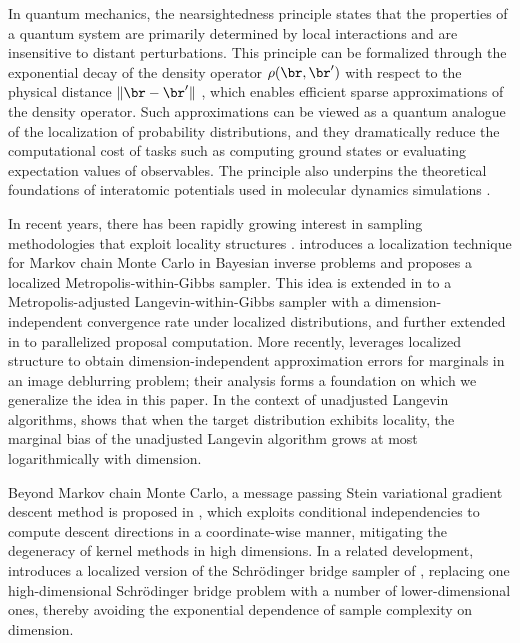 \documentclass[11pt]{article}
\begin{document}
In quantum mechanics, the nearsightedness principle \cite{PhysRevLett.76.3168} states that the properties of a quantum system are primarily determined by local interactions and are insensitive to distant perturbations.
%
This principle can be formalized through the exponential decay of the density operator $\rho(\br, \br')$ with respect to the physical distance $\|\br - \br'\|$ \cite{PhysRevLett.76.3168,MR3032838}, which enables efficient sparse approximations of the density operator.
Such approximations can be viewed as a quantum analogue of the localization of probability distributions, and they dramatically reduce the computational cost of tasks such as computing ground states or evaluating expectation values of observables.
The principle also underpins the theoretical foundations of interatomic potentials used in molecular dynamics simulations \cite{MR3463688}.



In recent years, there has been rapidly growing interest in sampling methodologies that exploit locality structures \cite{MR3901708,MR4108690,MR4111677,MR5004938,24M1694781}.
%
\cite{MR3901708} introduces a localization technique for Markov chain Monte Carlo in Bayesian inverse problems and proposes a localized Metropolis-within-Gibbs sampler.
This idea is extended in \cite{MR4111677} to a Metropolis-adjusted Langevin-within-Gibbs sampler with a dimension-independent convergence rate under localized distributions, and further extended in \cite{MR4108690} to parallelized proposal computation.
%
More recently, \cite{24M1694781} leverages localized structure to obtain dimension-independent approximation errors for marginals in an image deblurring problem; their analysis forms a foundation on which we generalize the idea in this paper.
%
In the context of unadjusted Langevin algorithms, \cite{chen2026convergence,lacker2025hierarchical} shows that when the target distribution exhibits locality, the marginal bias of the unadjusted Langevin algorithm grows at most logarithmically with dimension.



Beyond Markov chain Monte Carlo, a message passing Stein variational gradient descent method is proposed in \cite{pmlr-v80-zhuo18a,pmlr-v80-wang18l}, which exploits conditional independencies to compute descent directions in a coordinate-wise manner, mitigating the degeneracy of kernel methods in high dimensions.
In a related development, \cite{MR5004938} introduces a localized version of the Schrödinger bridge sampler of \cite{rsta.2024.0332}, replacing one high-dimensional Schrödinger bridge problem with a number of lower-dimensional ones, thereby avoiding the exponential dependence of sample complexity on dimension.
\end{document}
